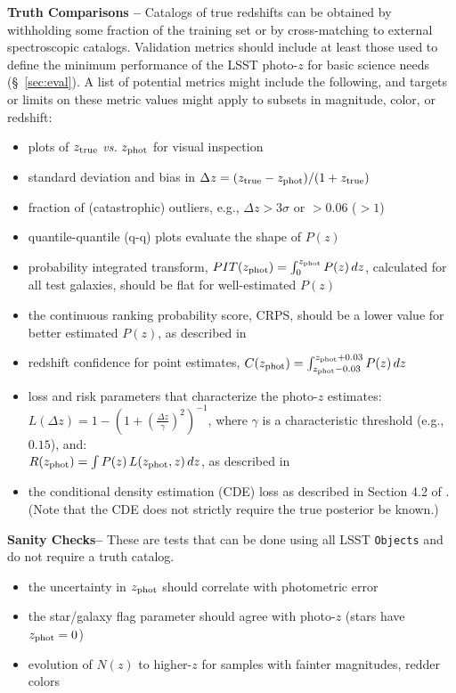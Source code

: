\documentclass[DM,lsstdraft,toc]{lsstdoc}
\begin{document}
{\bf Truth Comparisons --} 
Catalogs of true redshifts can be obtained by withholding some fraction of the training set or by cross-matching to external spectroscopic catalogs. Validation metrics should include at least those used to define the minimum performance of the LSST photo-$z$ for basic science needs (\S~\ref{sec:eval}). A list of potential metrics might include the following, and targets or limits on these metric values might apply to subsets in magnitude, color, or redshift: 
\vspace{-15pt}
\begin{itemize}
\item plots of $z_{\rm true}$ {\it vs.} $z_{\rm phot}$ for visual inspection
\item standard deviation and bias in $\Delta z = (z_{\rm true}-z_{\rm phot})/(1+z_{\rm true})$
\item fraction of (catastrophic) outliers, e.g., $\Delta z > 3\sigma$ or $>0.06$ ($>1$)
\item quantile-quantile (q-q) plots evaluate the shape of $P(z)$
\item probability integrated transform, $PIT(z_{\rm phot}) = \int_{0}^{z_{\rm phot}} P(z)\,dz$, calculated for all test galaxies, should be flat for well-estimated $P(z)$ \citep{2016arXiv160808016P}
\item the continuous ranking probability score, CRPS, should be a lower value for better estimated $P(z)$, as described in \citep{2016arXiv160808016P}
\item redshift confidence for point estimates, $C(z_{\rm phot}) = \int_{z_{\rm phot}-0.03}^{z_{\rm phot}+0.03} P(z)\,dz $
\item loss and risk parameters that characterize the photo-$z$ estimates:\\
$L(\Delta z) = 1 - \left(1+ \left(\frac{\Delta z}{\gamma} \right)^2 \right)^{-1}$, 
where $\gamma$ is a characteristic threshold (e.g., $0.15$), and:\\
$R(z_{\rm phot}) = \int P(z)\,L(z_{\rm phot},z)\,dz$, as described in \citet{2018PASJ...70S...9T}
\item the conditional density estimation (CDE) loss as described in Section 4.2 of \citet{2020arXiv200103621S}. (Note that the CDE does not strictly require the true posterior be known.)
\end{itemize}

{\bf Sanity Checks--} 
These are tests that can be done using all LSST {\tt Objects} and do not require a truth catalog.
\vspace{-15pt}
\begin{itemize}
\item the uncertainty in $z_{\rm phot}$ should correlate with photometric error
\item the star/galaxy flag parameter should agree with photo-$z$ (stars have $z_{\rm phot}=0$)
\item evolution of $N(z)$ to higher-$z$ for samples with fainter magnitudes, redder colors
\end{itemize}
\end{document}
